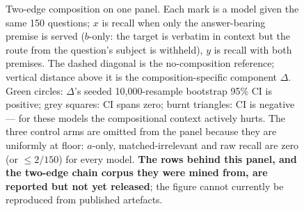 \begin{figure}[t]
\caption{Two-edge composition on one panel. Each mark is a model given the same 150 questions;
$x$ is recall when only the answer-bearing premise is served ($b$-only: the target is verbatim in
context but the route from the question's subject is withheld), $y$ is recall with both premises.
The dashed diagonal is the no-composition reference; vertical distance above it is the
composition-specific component $\Delta$. Green circles: $\Delta$'s seeded 10,000-resample
bootstrap 95\% CI is positive; grey squares: CI spans zero; burnt triangles: CI is negative ---
for these models the compositional context actively hurts. The three control arms are omitted
from the panel because they are uniformly at floor: $a$-only, matched-irrelevant and raw recall
are zero (or $\le 2/150$) for every model. \textbf{The rows behind this panel, and the two-edge
chain corpus they were mined from, are reported but not yet released}; the figure cannot currently
be reproduced from published artefacts.}
\label{fig:composition}
\end{figure}
